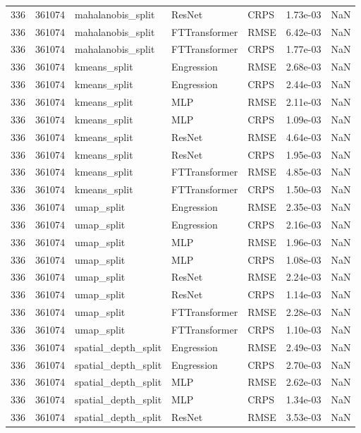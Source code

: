 \begin{tabular}{rrlllrr}
336 & 361074 & mahalanobis\_split & ResNet & CRPS & 1.73e-03 & NaN \\
336 & 361074 & mahalanobis\_split & FTTransformer & RMSE & 6.42e-03 & NaN \\
336 & 361074 & mahalanobis\_split & FTTransformer & CRPS & 1.77e-03 & NaN \\
336 & 361074 & kmeans\_split & Engression & RMSE & 2.68e-03 & NaN \\
336 & 361074 & kmeans\_split & Engression & CRPS & 2.44e-03 & NaN \\
336 & 361074 & kmeans\_split & MLP & RMSE & 2.11e-03 & NaN \\
336 & 361074 & kmeans\_split & MLP & CRPS & 1.09e-03 & NaN \\
336 & 361074 & kmeans\_split & ResNet & RMSE & 4.64e-03 & NaN \\
336 & 361074 & kmeans\_split & ResNet & CRPS & 1.95e-03 & NaN \\
336 & 361074 & kmeans\_split & FTTransformer & RMSE & 4.85e-03 & NaN \\
336 & 361074 & kmeans\_split & FTTransformer & CRPS & 1.50e-03 & NaN \\
336 & 361074 & umap\_split & Engression & RMSE & 2.35e-03 & NaN \\
336 & 361074 & umap\_split & Engression & CRPS & 2.16e-03 & NaN \\
336 & 361074 & umap\_split & MLP & RMSE & 1.96e-03 & NaN \\
336 & 361074 & umap\_split & MLP & CRPS & 1.08e-03 & NaN \\
336 & 361074 & umap\_split & ResNet & RMSE & 2.24e-03 & NaN \\
336 & 361074 & umap\_split & ResNet & CRPS & 1.14e-03 & NaN \\
336 & 361074 & umap\_split & FTTransformer & RMSE & 2.28e-03 & NaN \\
336 & 361074 & umap\_split & FTTransformer & CRPS & 1.10e-03 & NaN \\
336 & 361074 & spatial\_depth\_split & Engression & RMSE & 2.49e-03 & NaN \\
336 & 361074 & spatial\_depth\_split & Engression & CRPS & 2.70e-03 & NaN \\
336 & 361074 & spatial\_depth\_split & MLP & RMSE & 2.62e-03 & NaN \\
336 & 361074 & spatial\_depth\_split & MLP & CRPS & 1.34e-03 & NaN \\
336 & 361074 & spatial\_depth\_split & ResNet & RMSE & 3.53e-03 & NaN \\

\end{tabular}
